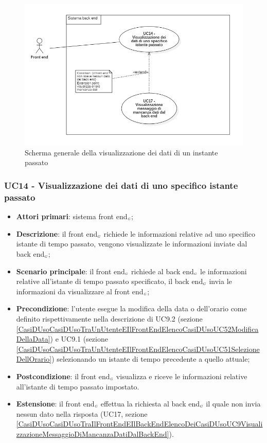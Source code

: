 \begin{center}
	\begin{figure}[H]
		\centering\includegraphics[scale=0.6]{../immagini/attori_casi/UC_14.png}
		\caption{Scherma generale della visualizzazione dei dati di un instante passato}
	\end{figure}
\end{center}

\subsubsection{UC14 - Visualizzazione dei dati di uno specifico istante passato}\label{CasiDUsoCasiDUsoTraIlFrontEndEIlBackEndElencoDeiCasiDUsoUC81VisualizzazioneDeiDatiDiUnoSpecificoIstante}
\begin{itemize}
	\item \textbf{Attori primari}: sistema front end$_{\scaleto{G}{3pt}}$;
	\item \textbf{Descrizione}: il front end$_{\scaleto{G}{3pt}}$ richiede le informazioni relative ad uno specifico istante di tempo passato, vengono visualizzate le informazioni inviate dal back end$_{\scaleto{G}{3pt}}$;
	\item \textbf{Scenario principale}:  il front end$_{\scaleto{G}{3pt}}$ richiede al back end$_{\scaleto{G}{3pt}}$ le informazioni relative all'istante di tempo passato specificato, il back end$_{\scaleto{G}{3pt}}$ invia le informazioni da visualizzare al front end$_{\scaleto{G}{3pt}}$;
	\item \textbf{Precondizione}: l’utente esegue la modifica della data o dell’orario come definito rispettivamente nella descrizione di UC9.2 (sezione \ref{CasiDUsoCasiDUsoTraUnUtenteEIlFrontEndElencoCasiDUsoUC52ModificaDellaData}) e UC9.1 (sezione \ref{CasiDUsoCasiDUsoTraUnUtenteEIlFrontEndElencoCasiDUsoUC51SelezioneDellOrario}) selezionando un istante di tempo precedente a quello attuale;
	\item \textbf{Postcondizione}: il front end$_{\scaleto{G}{3pt}}$ visualizza e riceve le informazioni relative all'istante di tempo passato impostato.
	\item \textbf{Estensione}: il front end$_{\scaleto{G}{3pt}}$ effettua la richiesta al back end$_{\scaleto{G}{3pt}}$ il quale non invia nessun dato nella risposta (UC17, sezione \ref{CasiDUsoCasiDUsoTraIlFrontEndEIlBackEndElencoDeiCasiDUsoUC9VisualizzazioneMessaggioDiMancanzaDatiDalBackEnd}).
\end{itemize}

